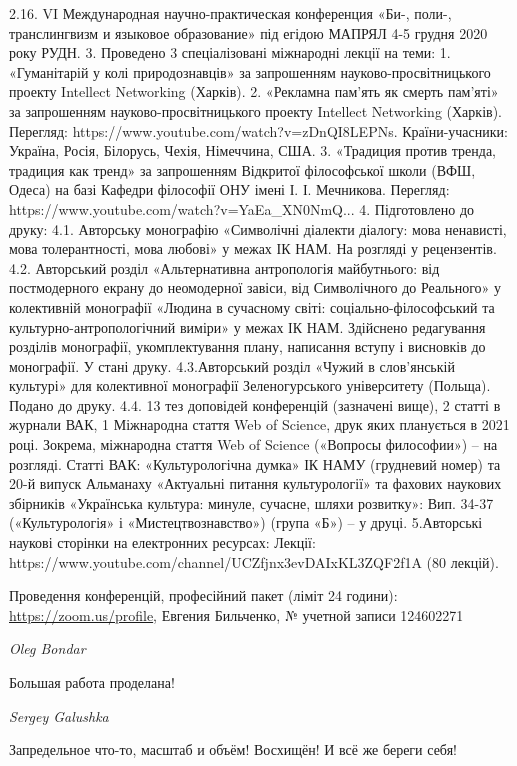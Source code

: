 2.16. VI Международная научно-практическая конференция «Би-, поли-, транслингвизм и языковое образование» під егідою МАПРЯЛ 4-5 грудня 2020 року РУДН.  
3. Проведено 3 спеціалізовані міжнародні лекції на теми:
1. «Гуманітарій у колі природознавців» за запрошенням науково-просвітницького проекту Intellect Networking (Харків).
2. «Рекламна пам’ять як смерть пам’яті» за запрошенням науково-просвітницького проекту Intellect Networking (Харків). Перегляд: https://www.youtube.com/watch?v=zDnQI8LEPNs. Країни-учасники: Україна, Росія, Білорусь, Чехія, Німеччина, США.
3. «Традиция против тренда, традиция как тренд» за запрошенням Відкритої філософської школи (ВФШ, Одеса) на базі Кафедри філософії ОНУ імені І. І. Мечникова. Перегляд: https://www.youtube.com/watch?v=YaEa_XN0NmQ...
4. Підготовлено до друку:
4.1. Авторську монографію «Символічні діалекти діалогу: мова ненависті, мова толерантності, мова любові» у межах ІК НАМ. На розгляді у рецензентів. 
4.2. Авторський розділ «Альтернативна антропологія майбутнього: від постмодерного екрану до неомодерної завіси, від Символічного до Реального» у колективній монографії «Людина в сучасному світі: соціально-філософський та культурно-антропологічний виміри» у межах ІК НАМ. Здійснено редагування розділів монографії, укомплектування плану, написання вступу і висновків до монографії. У стані друку.
4.3.Авторський розділ «Чужий в слов’янській культурі» для колективної монографії Зеленогурського університету (Польща). Подано до друку.
4.4. 13 тез доповідей конференцій (зазначені вище), 2 статті в журнали ВАК, 1 Міжнародна стаття Web of Science, друк яких планується в 2021 році.  Зокрема, міжнародна стаття Web of Science («Вопросы философии») – на розгляді. Статті ВАК: «Культурологічна думка» ІК НАМУ (грудневий номер) та 20-й випуск Альманаху «Актуальні питання культурології» та фахових наукових збірників «Українська культура: минуле, сучасне, шляхи розвитку»: Вип. 34-37 («Культурологія» і «Мистецтвознавство») (група «Б») – у друці.
5.Авторські наукові сторінки на електронних ресурсах: 
Лекції: https://www.youtube.com/channel/UCZfjnx3evDAIxKL3ZQF2f1A
(80 лекцій). 

Проведення конференцій, професійний пакет (ліміт 24 години):
\url{https://zoom.us/profile}, Евгения Бильченко, № учетной записи 124602271

\emph{Oleg Bondar}

Большая работа проделана!

\emph{Sergey Galushka}

Запредельное что-то, масштаб и объём! Восхищён! И всё же береги себя!

